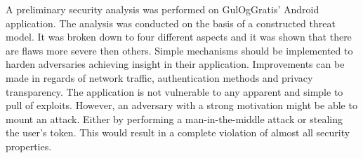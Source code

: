 A preliminary security analysis was performed on GulOgGratis' Android application. The analysis was conducted on the basis of a constructed threat model. It was broken down to four different aspects and it was shown that there are flaws more severe then others. Simple mechanisms should be implemented to harden adversaries achieving insight in their application. Improvements can be made in regards of network traffic, authentication methods and privacy transparency. The application is not vulnerable to any apparent and simple to pull of exploits. However, an adversary with a strong motivation might be able to mount an attack. Either by performing a man-in-the-middle attack or stealing the user's token. This would result in a complete violation of almost all security properties.      